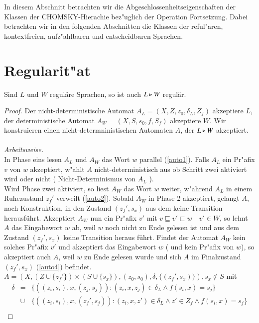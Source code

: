 In diesem Abschnitt betrachten wir die Abgeschlossenheitseigenschaften der Klassen der CHOMSKY-Hierachie bez"uglich der Operation Fortsetzung. 
Dabei betrachten wir in den folgenden Abschnitten die Klassen der reful"aren, kontextfreien, aufz"ahlbaren und entscheidbaren Sprachen.

\section{Regularit"at}\label{abschnittreg}
\begin{satz}
Sind $L$ und $W$ regul\"are Sprachen, so ist auch $L\triangleright W$ regul\"ar.
\end{satz}
\begin{proof}
Der nicht-deterministische Automat $A_L= (X,Z,z_{0},\delta_L,Z_f)$ akzeptiere $L$, der deterministische Automat $A_W = (X,S,s_{0},f,S_{f})$ akzeptiere $W$.
Wir konstruieren einen nicht-determninistischen Automaten $A$, der $L\triangleright W$ akzeptiert.\\\\\emph{Arbeitsweise.}\\
In Phase eins lesen $A_L$ und $A_W$ das Wort $w$ parallel (\ref{auto1}). Falls $A_L$ ein Pr"afix $v$ von $w$ akzeptiert, w"ahlt $A$ nicht-deterministisch aus ob Schritt zwei aktiviert wird oder nicht ( Nicht-Determinismus von $A_L$ ).\\
Wird Phase zwei aktiviert, so liest $A_W$ das Wort $w$ weiter, w"ahrend $A_L$ in einem Ruhezustand $z_f'$ verweilt (\ref{auto2}). Sobald $A_W$ in Phase 2 akzeptiert, gelangt $A$, nach Konstruktion, in den Zustand $(z_f',s_x)$ aus dem keine Transition herausführt. Akzeptiert $A_W$ nun ein Pr"afix $v'$ mit $v\sqsubseteq v'\sqsubset w\quad v'\in W$, so lehnt $A$ das Eingabewort $w$ ab, weil $w$ noch nicht zu Ende gelesen ist und aus dem Zustand $(z_f',s_x)$ keine Transition heraus führt. Findet der Automat $A_W$ kein solches Pr"afix $v'$ und akzeptiert das Eingabewort $w$ ( und kein Pr"afix von $w$), so akzeptiert auch $A$, weil $w$ zu Ende gelesen wurde und sich $A$ im Finalzustand $(z_f',s_x)$ (\ref{auto4}) befindet.
\\$A = (X,(Z\cup \{ z_f'\})\times (S\cup \{ s_x\}), (z_{0},s_{0}), \delta , \{ (z_f',s_x) \} ), s_x\notin S$
mit
\setcounter{equation}{0}
\begin{eqnarray}
 \delta &=&\{ ((z_i,s_i),x,(z_j,s_j)) : (z_i,x,z_j) \in \delta_L \wedge f(s_i,x)=s_j  \}  \label{auto1} \\
 & \cup & \{ ((z_i,s_i),x,(z_f',s_j)) : (z_i,x,z') \in \delta_L \wedge z'\in Z_f \wedge f(s_i,x)=s_j  \} \label{auto2}\\

\end{eqnarray}
\end{proof}
